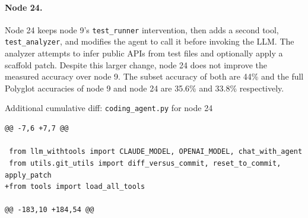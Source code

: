 \documentclass{article}
\begin{document}
\paragraph{Node 24.}
Node 24 keeps node 9's \texttt{test\_runner} intervention, then adds a second tool, \texttt{test\_analyzer}, and modifies the agent to call it before invoking the LLM. The analyzer attempts to infer public APIs from test files and optionally apply a scaffold patch. Despite this larger change, node 24 does not improve the measured accuracy over node 9. The subset accuracy of both are 44\% and the full Polyglot accuracies of node 9 and node 24 are 35.6\% and 33.8\% respectively.

\begin{codebox}{Additional cumulative diff: \texttt{coding\_agent.py} for node 24}
\begin{lstlisting}[style=diffstyle]
@@ -7,6 +7,7 @@

 from llm_withtools import CLAUDE_MODEL, OPENAI_MODEL, chat_with_agent
 from utils.git_utils import diff_versus_commit, reset_to_commit, apply_patch
+from tools import load_all_tools

@@ -183,10 +184,54 @@


\end{lstlisting}
\end{codebox}
\end{document}

